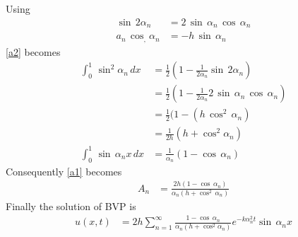 Using 
\begin{align}
\sin\,2\alpha_n&=2\,\sin\,\alpha_n\,\cos\,\alpha_n\\
a_n\,\cos_,\alpha_n&=-h\,\sin\,\alpha_n
\end{align}
\eqref{a2} becomes
\begin{align}
\int_0^1\,\sin^2\alpha_n\,dx&=\frac{1}{2}\left(1-\frac{1}{2\alpha_n}\sin\,2\alpha_n\right)\\
&=\frac{1}{2}(1-\frac{1}{2\alpha_n}2\,\sin\,\alpha_n\,\cos\,\alpha_n)\\
&=\frac{1}{2}(1-(h\,\cos^2\,\alpha_n)\\
&=\frac{1}{2h}(h+\cos^2\alpha_n)\\
\int_0^1\,\sin\,\alpha_n x\,dx&=\frac{1}{\alpha_n}(1-\cos\,\alpha_n)
\end{align}
Consequently \eqref{a1} becomes
\begin{align*}
A_n&=\frac{2h(1-\cos\,\alpha_n)}{\alpha_n(h+\cos^2\,\alpha_n)}
\end{align*}
Finally the solution of BVP is
\begin{align}
u(x,t)&=2h\sum_{n=1}^\infty\frac{1-\cos\,\alpha_n}{\alpha_n(h+\cos^2\alpha_n)}e^{-k\alpha^2_nt}\sin\,\alpha_n x
\end{align}
